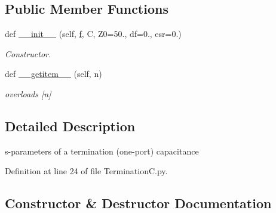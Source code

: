 \subsection*{Public Member Functions}
\begin{DoxyCompactItemize}
\item 
def \hyperlink{classSignalIntegrity_1_1SParameters_1_1Devices_1_1TerminationC_1_1TerminationC_a441cc92ccb545fe35cb1959bbef689b0}{\+\_\+\+\_\+init\+\_\+\+\_\+} (self, \hyperlink{classSignalIntegrity_1_1SParameters_1_1SParameters_1_1SParameters_a32e7a34d6837fe949b413c852a0447f8}{f}, C, Z0=50., df=0., esr=0.)
\begin{DoxyCompactList}\small\item\em Constructor. \end{DoxyCompactList}\item 
def \hyperlink{classSignalIntegrity_1_1SParameters_1_1Devices_1_1TerminationC_1_1TerminationC_ab7a6da5139e0878b590d68292aaa70f2}{\+\_\+\+\_\+getitem\+\_\+\+\_\+} (self, n)
\begin{DoxyCompactList}\small\item\em overloads \mbox{[}n\mbox{]} \end{DoxyCompactList}\end{DoxyCompactItemize}


\subsection{Detailed Description}
s-\/parameters of a termination (one-\/port) capacitance 

Definition at line 24 of file Termination\+C.\+py.



\subsection{Constructor \& Destructor Documentation}
\mbox{\label{classSignalIntegrity_1_1SParameters_1_1Devices_1_1TerminationC_1_1TerminationC_a441cc92ccb545fe35cb1959bbef689b0}} 
